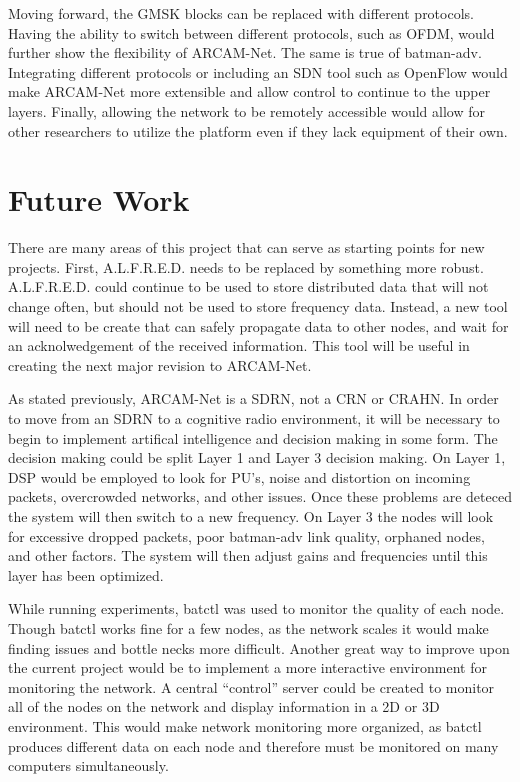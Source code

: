 Moving forward, the GMSK blocks can be replaced with different protocols. Having the ability to switch between different protocols, such as OFDM, would further show the flexibility of ARCAM-Net. The same is true of batman-adv. Integrating  different protocols or including an SDN tool such as OpenFlow would make ARCAM-Net more extensible and allow control to continue to the upper layers. Finally, allowing the network to be remotely accessible would allow for other researchers to utilize the platform even if they lack equipment of their own. 

\section{Future Work}

There are many areas of this project that can serve as starting points for new projects. First, A.L.F.R.E.D. needs to be replaced by something more robust. A.L.F.R.E.D. could continue to be used to store distributed data that will not change often, but should not be used to store frequency data. Instead, a new tool will need to be create that can safely propagate data to other nodes, and wait for an acknolwedgement of the received information. This tool will be useful in creating the next major revision to ARCAM-Net. 

As stated previously, ARCAM-Net is a SDRN, not a CRN or CRAHN. In order to move from an SDRN to a cognitive radio environment, it will be necessary to begin to implement artifical intelligence and decision making in some form. The decision making could be split Layer 1 and Layer 3 decision making. On Layer 1, DSP would be employed to look for PU's, noise and distortion on incoming packets, overcrowded networks, and other issues. Once these problems are deteced the system will then switch to a new frequency. On Layer 3 the nodes will look for excessive dropped packets, poor batman-adv link quality, orphaned nodes, and other factors. The system will then adjust gains and frequencies until this layer has been optimized. 

While running experiments, batctl was used to monitor the quality of each node. Though batctl works fine for a few nodes, as the network scales it would make finding issues and bottle necks more difficult. Another great way to improve upon the current project would be to implement a more interactive environment for monitoring the network. A central ``control'' server could be created to monitor all of the nodes on the network and display information in a 2D or 3D environment. This would make network monitoring more organized, as batctl produces different data on each node and therefore must be monitored on many computers simultaneously. 
